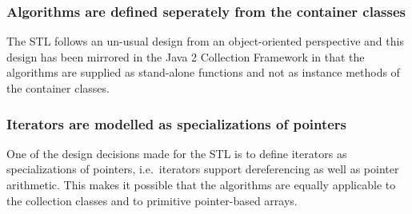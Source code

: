 
\subsubsection{Algorithms are defined seperately from the container classes}

The STL follows an un-usual design from an object-oriented perspective and
this design has been mirrored in the Java 2 Collection Framework in that the 
algorithms are supplied as stand-alone functions and not as instance 
methods of the container classes.


\subsubsection{Iterators are modelled as specializations of pointers}

One of the design decisions made for the STL is to define iterators as
specializations of pointers, i.e.\ iterators support dereferencing as
well as pointer arithmetic. This makes it possible that the algorithms
are equally applicable to the collection classes and to primitive
pointer-based arrays.
